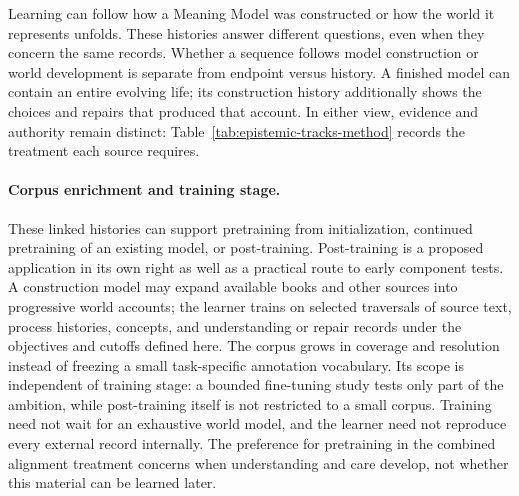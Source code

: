 \documentclass[10pt]{article}
\begin{document}
Learning can follow how a Meaning Model was constructed or how the world it
represents unfolds. These histories answer different questions, even when
they concern the same records. Whether a sequence follows model construction
or world development is separate from endpoint versus history. A finished
model can contain an entire evolving life; its construction history
additionally shows the choices and repairs that produced that account.
In either view, evidence and authority remain
distinct: Table~\ref{tab:epistemic-tracks-method} records the treatment each
source requires.

\paragraph{Corpus enrichment and training stage.}
These linked histories can support pretraining from initialization, continued
pretraining of an existing model, or post-training. Post-training is a proposed
application in its own right as well as a practical route to early component
tests. A construction model may expand available books and other sources into
progressive world accounts; the learner trains on selected traversals of source
text, process histories, concepts, and understanding or repair records under
the objectives and cutoffs defined here. The corpus grows in coverage and
resolution instead of freezing a small task-specific annotation vocabulary.
Its scope is independent of training stage: a bounded fine-tuning study tests
only part of the ambition, while post-training itself is not restricted to a
small corpus. Training need not wait for an exhaustive world model, and the
learner need not reproduce every external record internally. The preference
for pretraining in the combined alignment treatment concerns when understanding
and care develop, not whether this material can be learned later.
\end{document}
